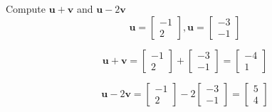 \documentclass{../mathhomework}
\newcommand{\Vect}[1]{\pmb{#1}}
\begin{document}
\pagebreak
\begin{problem}[1.3\#1]
    Compute $\Vect{u} + \Vect{v}$ and $\Vect{u} - 2\Vect{v}$
    \begin{equation*}
        \Vect{u} = \begin{bmatrix}
            -1 \\ 2
        \end{bmatrix}, \Vect{u} = \begin{bmatrix}
            -3 \\ -1
        \end{bmatrix}
    \end{equation*}

    \begin{solution}
        \begin{equation*}
            \Vect{u} + \Vect{v} = \begin{bmatrix}
                -1 \\ 2
            \end{bmatrix} + \begin{bmatrix}
                -3 \\ -1
            \end{bmatrix} = \begin{bmatrix}
                -4 \\ 1
            \end{bmatrix}
        \end{equation*}

        \begin{equation*}
            \Vect{u} - 2\Vect{v} = \begin{bmatrix}
                -1 \\ 2
            \end{bmatrix} - 2\begin{bmatrix}
                -3 \\ -1
            \end{bmatrix} = \begin{bmatrix}
                5 \\ 4
            \end{bmatrix}
        \end{equation*}
    \end{solution}
\end{problem}
\end{document}

